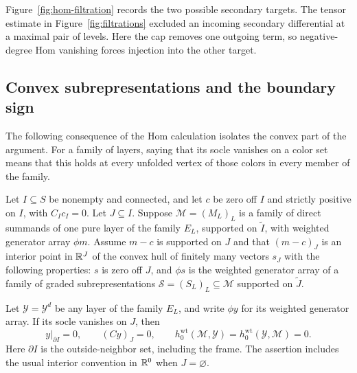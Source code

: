 Figure~\ref{fig:hom-filtration} records the two possible secondary
targets.  The tensor estimate in Figure~\ref{fig:filtrations} excluded
an incoming secondary differential at a maximal pair of levels.  Here the
cap removes one outgoing term, so negative-degree Hom vanishing forces
injection into the other target.



\subsection{Convex subrepresentations and the boundary sign}

The following consequence of the Hom calculation isolates the convex
part of the argument.  For a family of layers, saying that its socle
vanishes on a color set means that this holds at every unfolded vertex
of those colors in every member of the family.

\begin{lemma}
\label{lem:rigidity-separation}
Let $I\subseteq S$ be nonempty and connected, and let $c$ be zero off $I$
and strictly positive on $I$, with $C_Ic_I=0$.  Let $J\subseteq I$.
Suppose $\mathcal M=(M_L)_L$ is a family of direct summands of one pure
layer of the family $E_L$, supported on $\widetilde I$, with weighted
generator array $\phi m$.  Assume $m-c$ is supported on $J$ and that
$(m-c)_J$ is an interior point in $\mathbb R^J$ of the convex hull of finitely
many vectors $s_J$ with the following properties: $s$ is zero off $J$,
and $\phi s$ is the weighted generator array of a family of graded
subrepresentations $\mathcal S=(S_L)_L\subseteq\mathcal M$ supported on
$\widetilde J$.

Let $\mathcal Y=\mathcal Y^d$ be any layer of the family $E_L$, and write
$\phi y$ for its weighted generator array.  If its socle vanishes on $J$,
then
\begin{equation}
 y|_{\partial I}=0,\qquad
 (Cy)_J=0,\qquad
 h_0^{\mathrm{wt}}(\mathcal M,\mathcal Y)
 =h_0^{\mathrm{wt}}(\mathcal Y,\mathcal M)=0.
 \label{eq:rigidity-separation-conclusions}
\end{equation}
Here $\partial I$ is the outside-neighbor set, including the frame.
The assertion includes the usual interior convention in $\mathbb R^0$ when
$J=\varnothing$.
\end{lemma}

